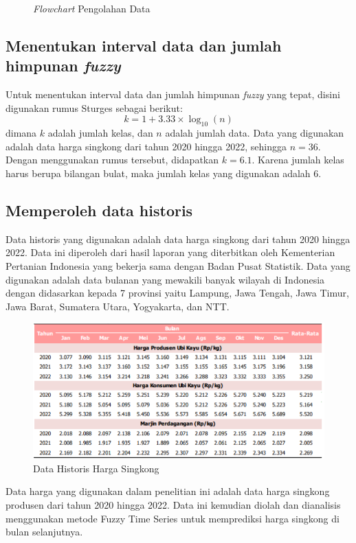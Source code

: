 \documentclass[conference]{IEEEtran}
\begin{document}
\begin{figure}[htbp]
    \caption{\textit{Flowchart} Pengolahan Data}
\end{figure}


\subsection{Menentukan interval data dan jumlah himpunan \textit{fuzzy}}\label{AA}
Untuk menentukan interval data dan jumlah himpunan \textit{fuzzy} yang tepat, disini digunakan rumus Sturges sebagai berikut:
\begin{equation}
    k = 1 + 3.33 \times \log_{10}(n)
\end{equation}
dimana $k$ adalah jumlah kelas, dan $n$ adalah jumlah data. Data yang digunakan adalah data harga singkong dari tahun 2020 hingga 2022, sehingga $n = 36$. Dengan menggunakan rumus tersebut, didapatkan $k = 6.1$. Karena jumlah kelas harus berupa bilangan bulat, maka jumlah kelas yang digunakan adalah 6.
\subsection{Memperoleh data historis}
Data historis yang digunakan adalah data harga singkong dari tahun 2020 hingga 2022. Data ini diperoleh dari hasil laporan yang diterbitkan oleh Kementerian Pertanian Indonesia yang bekerja sama dengan Badan Pusat Statistik. Data yang digunakan adalah data bulanan yang mewakili banyak wilayah di Indonesia dengan didasarkan kepada 7 provinsi yaitu Lampung, Jawa Tengah, Jawa Timur, Jawa Barat, Sumatera Utara, Yogyakarta, dan NTT.

\begin{figure}[H]
    \centering
    \includegraphics[scale=0.5]{images/Data Historis.png} 
    \caption{Data Historis Harga Singkong}
\end{figure}
Data harga yang digunakan dalam penelitian ini adalah data harga singkong produsen dari tahun 2020 hingga 2022. Data ini kemudian diolah dan dianalisis menggunakan metode Fuzzy Time Series untuk memprediksi harga singkong di bulan selanjutnya.
\end{document}
